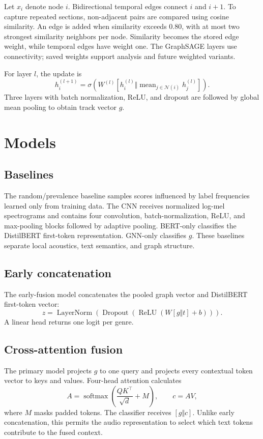 \IfFileExists{IEEEtran.cls}{\usingieeetrue\documentclass[conference]{IEEEtran}}{\usingieeefalse\documentclass[10pt,twocolumn]{article}}
\begin{document}
Let $x_i$ denote node $i$. Bidirectional temporal edges connect $i$ and $i+1$. To capture repeated sections, non-adjacent pairs are compared using cosine similarity. An edge is added when similarity exceeds $0.80$, with at most two strongest similarity neighbors per node. Similarity becomes the stored edge weight, while temporal edges have weight one. The GraphSAGE layers use connectivity; saved weights support analysis and future weighted variants.

For layer $l$, the update is
\begin{equation}
h_i^{(l+1)}=\sigma\left(W^{(l)}[h_i^{(l)}\Vert \operatorname{mean}_{j\in\mathcal{N}(i)}h_j^{(l)}]\right).
\end{equation}
Three layers with batch normalization, ReLU, and dropout are followed by global mean pooling to obtain track vector $g$.

\section{Models}
\subsection{Baselines}
The random/prevalence baseline samples scores influenced by label frequencies learned only from training data. The CNN receives normalized log-mel spectrograms and contains four convolution, batch-normalization, ReLU, and max-pooling blocks followed by adaptive pooling. BERT-only classifies the DistilBERT first-token representation. GNN-only classifies $g$. These baselines separate local acoustics, text semantics, and graph structure.

\subsection{Early concatenation}
The early-fusion model concatenates the pooled graph vector and DistilBERT first-token vector:
\begin{equation}
z=\operatorname{LayerNorm}(\operatorname{Dropout}(\operatorname{ReLU}(W[g\Vert t]+b))).
\end{equation}
A linear head returns one logit per genre.

\subsection{Cross-attention fusion}
The primary model projects $g$ to one query and projects every contextual token vector to keys and values. Four-head attention calculates
\begin{equation}
A=\operatorname{softmax}\left(\frac{QK^\top}{\sqrt{d}}+M\right), \qquad c=AV,
\end{equation}
where $M$ masks padded tokens. The classifier receives $[g\Vert c]$. Unlike early concatenation, this permits the audio representation to select which text tokens contribute to the fused context.
\end{document}
